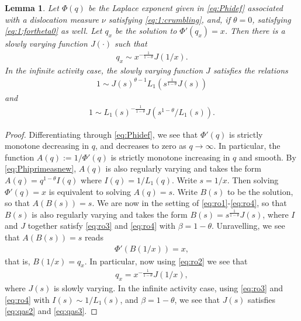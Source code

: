 \documentclass[a4,12pt]{amsart}
\numberwithin{equation}{section}
\newtheorem{lemma}[thm]{Lemma}
\begin{document}
\begin{lemma} \label{lem:qx}
Let $\Phi(q)$ be the Laplace exponent given in \eqref{eq:Phidef} associated with a dislocation measure $\nu$ satisfying \eqref{eq:1:crumbling}, and, if $\theta = 0$, satisfying \eqref{eq:1:fortheta0} as well. Let $q_x$ be the solution to $\Phi'(q_x) = x$. 
Then there is a slowly varying function $J(\cdot)$ such that 
\begin{align} \label{eq:qas}
    		q_x \sim x^{-\frac{1}{1-\theta}} J(1/x).
\end{align}
In the infinite activity case, the slowly varying function $J$ satisfies the relations
\begin{align} \label{eq:qas2}
1 \sim J(s)^{\theta-1}L_1(s^{ \frac{1}{1-\theta}}J(s))
\end{align} 
and 
\begin{align} \label{eq:qas3}
1 \sim L_1(s)^{ - \frac{1}{1-\theta}} J(s^{1-\theta}/L_1(s)).
\end{align}
\end{lemma}
\begin{proof}
Differentiating through \eqref{eq:Phidef}, we see that $\Phi'(q)$ is strictly monotone decreasing in $q$, and decreases to zero as $q \to \infty$. In particular, the function $A(q) := 1/\Phi'(q)$ is strictly monotone increasing in $q$ and smooth. By \eqref{eq:Phiprimeasnew}, $A(q)$ is also regularly varying and takes the form $A(q) = q^{1-\theta}I(q)$ where $I(q) = 1/L_1(q)$. Write $s = 1/x$. Then solving $\Phi'(q) = x$ is equivalent to solving $A(q) = s$. Write $B(s)$ to be the solution, so that $A(B(s)) = s$. We are now in the setting of \eqref{eq:ro1}-\eqref{eq:ro4}, so that $B(s)$ is also regularly varying and takes the form $B(s) = s^{\frac{1}{1-\theta}}J(s)$, where $I$ and $J$ together satisfy \eqref{eq:ro3} and \eqref{eq:ro4} with $\beta=1-\theta$. Unravelling, we see that $A(B(s)) = s$ reads
\begin{align*}
\Phi'(B(1/x)) = x,
\end{align*}
that is, $B(1/x) = q_x$. In particular, now using \eqref{eq:ro2} we see that
\begin{align*}
q_x = x^{ - \frac{1}{1-\theta}} J(1/x),
\end{align*}
where $J(s)$ is slowly varying. In the infinite activity case, using \eqref{eq:ro3} and \eqref{eq:ro4} with $I(s) \sim 1/L_1(s)$, and $\beta = 1-\theta$, we see that $J(s)$ satisfies \eqref{eq:qas2} and \eqref{eq:qas3}. 

\end{proof}
\end{document}
